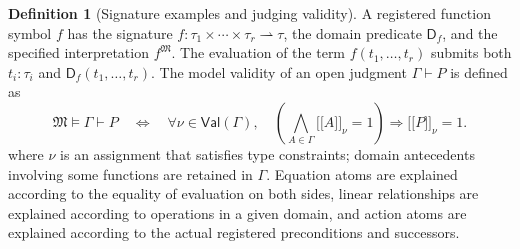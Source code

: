 \documentclass[12pt,a4paper,openany,notitlepage]{report}
\theoremstyle{plain}
\theoremstyle{definition}
\newtheorem{definition}[theorem]{Definition}
\theoremstyle{remark}
\begin{document}
\begin{CJK*}
\begin{definition}
[Signature examples and judging validity]\label{exp:logic:signature}
A registered function symbol $f$ has the signature $f:\tau_1\times\cdots\times\tau_r\rightharpoonup\tau$, the domain predicate $\mathsf D_f$, and the specified interpretation $f^{\mathfrak M}$. The evaluation of the term $f(t_1,\ldots,t_r)$ submits both $t_i:\tau_i$ and $\mathsf D_f(t_1,\ldots,t_r)$. The model validity of an open judgment $\Gamma\vdash P$ is defined as \[
 \mathfrak M\models\Gamma\vdash P
 \quad\Longleftrightarrow\quad
 \forall\nu\in\mathsf{Val}(\Gamma),\quad
 \left(\bigwedge_{A\in\Gamma}\lbrack\!\lbrack A\rbrack\!\rbrack_\nu=1\right)
 \Rightarrow\lbrack\!\lbrack P\rbrack\!\rbrack_\nu=1.
\] where $\nu$ is an assignment that satisfies type constraints; domain antecedents involving some functions are retained in $\Gamma$. Equation atoms are explained according to the equality of evaluation on both sides, linear relationships are explained according to operations in a given domain, and action atoms are explained according to the actual registered preconditions and successors.\end{definition}



\end{CJK*}
\end{document}
